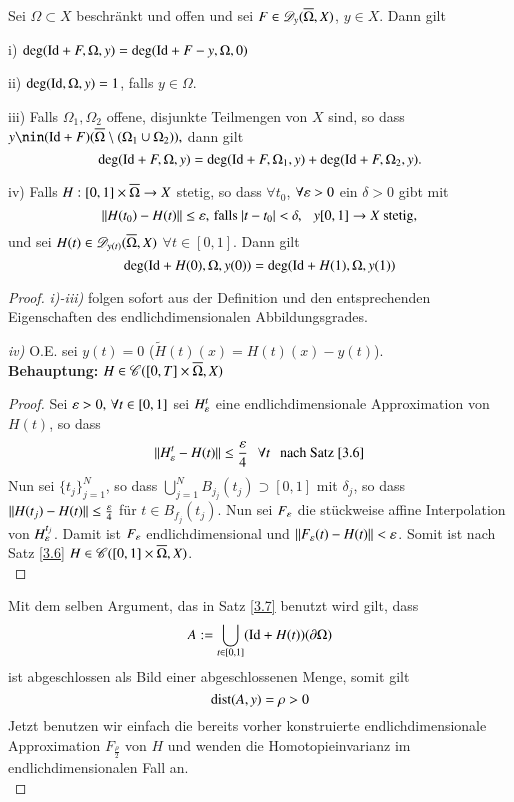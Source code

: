 \begin{theorem}\label{3.10}
    Sei $\Omega\subset X$ beschränkt und offen und sei $F\in \mathscr D_y(\overline\Omega,X)$, $y\in X$. Dann gilt
    \begin{description}
        \item{i)}
        $\deg(\mathrm{Id}+F,\Omega,y)=\deg(\mathrm{Id}+F-y,\Omega,0)$
        \item{ii)}
        $\deg(\mathrm{Id}, \Omega,y)=1$, falls $y\in \Omega.$
        \item{iii)}
        Falls $\Omega_1,\Omega_2$ offene, disjunkte Teilmengen von $X$ sind, so dass
        $y\nin (\Id+F)(\ol\Omega\setminus (\Omega_1\cup\Omega_2)),$ dann gilt
        \[
            \deg(\mathrm{Id}+F,\Omega,y)=\deg(\mathrm{Id}+F,\Omega_1,y)+\deg(\mathrm{Id}+F,\Omega_2,y).
        \]
        \item{iv)}
        Falls $H:[0,1]\times\overline\Omega\rightarrow X$ stetig, so dass $\forall t_0$, $\forall\varepsilon>0$ ein
        $\delta>0$ gibt mit
        \[
            \|H(t_0)-H(t)\|\leq \varepsilon, \, \text{falls } |t-t_0|<\delta, \hspace{.25cm} y[0,1]\rightarrow X \text{ stetig,}
        \]
        und sei $H(t)\in \mathscr D _{y(t)}(\overline\Omega,X)$ $\forall t\in[0,1]$. Dann gilt
        \[
            \deg(\mathrm{Id}+H(0),\Omega,y(0))=\deg(\mathrm{Id}+H(1),\Omega,y(1))
        \]
    \end{description}
\end{theorem}

\begin{proof}
    \textit{i)-iii)} folgen sofort aus der Definition und den entsprechenden Eigenschaften des
    endlichdimensionalen Abbildungsgrades.

    \noindent\textit{iv)} 
        O.E. sei $y(t)=0$ ($\tilde H(t)(x)=H(t)(x)-y(t)$).\\
        \textbf{Behauptung:} $H\in \mathscr C([0,T]\times \overline\Omega,X)$
        \begin{proof}
            Sei $\varepsilon >0,\, \forall t\in [0,1]$ sei $H_\varepsilon^t$ eine endlichdimensionale Approximation
            von $H(t)$, so dass
            \[
                \|H_\varepsilon^t-H(t)\|\leq\frac{\varepsilon}4 \hspace{.25cm} \forall t \hspace{.25cm} \text{nach Satz \ref{3.6}}
            \]
            Nun sei $\{t_j\}_{j=1}^N$, so dass $\bigcup _{j=1}^N B_{j_j}(t_j)\supset [0,1]$ mit $\delta_j
            $, so dass $\|H(t_j)-H(t)\|\leq \frac{\varepsilon}4$ für $t\in B_{f_j}(t_j)$. Nun sei $F_\varepsilon$ die
            stückweise affine Interpolation von $H_\varepsilon^{t_j}$. Damit ist $F_\varepsilon$ endlichdimensional und
            $\|F_\varepsilon(t)-H(t)\|<\varepsilon$. Somit ist nach Satz \ref{3.6} $H\in \mathscr C([0,1]\times 
            \overline \Omega, X)$.
            \[ \]
        \end{proof}
        Mit dem selben Argument, das in Satz \ref{3.7} benutzt wird gilt, dass
        \[
            A:=\bigcup_{t\in [0,1]} (\mathrm{Id}+H(t))(\partial \Omega)
        \]
        ist abgeschlossen als Bild einer abgeschlossenen Menge, somit gilt
        \[
            \mathrm{dist}(A,y)=\rho>0
        \]
        Jetzt benutzen wir einfach die bereits vorher konstruierte endlichdimensionale Approximation 
        $F_{\frac\rho2}$ von $H$ und wenden die Homotopieinvarianz im endlichdimensionalen Fall an.
        \[ \]
\end{proof}

